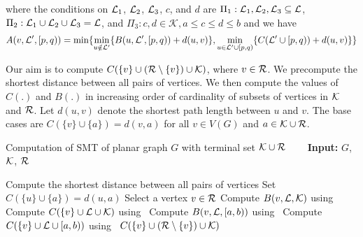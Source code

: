 where the conditions on $\mathcal{L}_1$, $\mathcal{L}_2$, $\mathcal{L}_3$, $c$, and $d$ are $\Pi_1: \mathcal{L}_1,\mathcal{L}_2,\mathcal{L}_3 \subseteq \mathcal{L}$, $\Pi_2: \mathcal{L}_1 \cup \mathcal{L}_2 \cup \mathcal{L}_3 = \mathcal{L}$, and $\Pi_3: c,d \in \mathcal{K}, a\leq c \leq d \leq b$ and we have 
\begin{equation}\label{eq:dw_A}
    A(v,\mathcal{L}',[p,q))=\min\{\min_{u \notin \mathcal{L}'}\{B(u,\mathcal{L}',[p,q))+d(u,v)\},\min_{u \in \mathcal{L}' \cup [p,q)}\{C(\mathcal{L}' \cup [p,q))+d(u,v)\}\}
\end{equation}

Our aim is to compute $C(\{v\} \cup (\mathcal{R}\setminus \{v\}) \cup \mathcal{K})$, where $v \in \mathcal{R}$. We precompute the shortest distance between all pairs of vertices. We then compute the values of $C(.)$ and $B(.)$ in increasing order of cardinality of subsets of vertices in $\mathcal{K}$ and $\mathcal{R}$. Let $d(u,v)$ denote the shortest path length between $u$ and $v$. The base cases are $C(\{v\} \cup \{a\}) = d(v,a)$ for all $v \in V(G)$ and $a \in \mathcal{K} \cup \mathcal{R}$.

\begin{algorithm}[H]
\caption{Computation of SMT of planar graph $G$ with terminal set $\mathcal{K} \cup \mathcal{R}$ ~~~ \textbf{Input:} $G$, $\mathcal{K}$, $\mathcal{R}$}\label{alg:smt_planar}
\begin{algorithmic}[1]
\State Compute the shortest distance between all pairs of vertices
\State Set $C(\{u\} \cup \{a\}) = d(u,a)$
\EndFor
\State Select a vertex $v \in \mathcal{R}$
\State Compute $B(v,\mathcal{L},\mathcal{K})$ using~
\State Compute $C(\{v\} \cup \mathcal{L} \cup \mathcal{K})$ using~
\Else
\For{each $[a,b) \subseteq \C{K}$ of size $j$}
\State Compute $B(v,\mathcal{L},[a,b))$ using~
\State Compute $C(\{v\} \cup \mathcal{L} \cup [a,b))$ using~
\EndFor
\EndIf
\EndFor
\EndFor
\EndFor
\State \Return $C(\{v\} \cup (\mathcal{R}\setminus \{v\}) \cup \mathcal{K})$
\end{algorithmic}
\end{algorithm}

